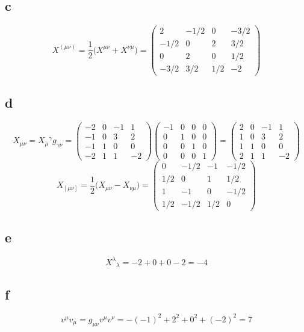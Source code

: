 \documentclass{article}
\begin{document}
\subsection*{c}
\[
	X^{(\mu\nu)} = \frac{1}{2}\Big( X^{\mu\nu} + X^{\nu\mu} \Big)
	= \begin{pmatrix}
		2 & -1/2 & 0 & -3/2 \\
		-1/2 & 0 & 2 & 3/2 \\
		0 & 2 & 0 & 1/2 \\
		-3/2 & 3/2 & 1/2 & -2
	\end{pmatrix}
\]
\subsection*{d}
\[
	X_{\mu\nu} = X_{\mu}{}^{\gamma}g_{\gamma\nu}
	= \begin{pmatrix}
		-2 & 0 & -1 & 1 \\
		-1 & 0 & 3 & 2 \\
		-1 & 1 & 0 & 0 \\
		-2 & 1 & 1 & -2
	\end{pmatrix}
	\begin{pmatrix}
		-1 & 0 & 0 & 0 \\
		0 & 1 & 0 & 0 \\
		0 & 0 & 1 & 0 \\
		0 & 0 & 0 & 1
	\end{pmatrix}
	=  \begin{pmatrix}
		2 & 0 & -1 & 1 \\
		1 & 0 & 3 & 2 \\
		1 & 1 & 0 & 0 \\
		2 & 1 & 1 & -2
	\end{pmatrix}
\]
\[
	X_{[\mu\nu]} = \frac{1}{2} \Big( X_{\mu\nu} - X_{\nu\mu} \Big)
 	= \begin{pmatrix}
		0 & -1/2 & -1 & -1/2 \\
		1/2 & 0 & 1 & 1/2 \\
		1 & -1 & 0 & -1/2 \\
		1/2 & -1/2 & 1/2 & 0
	\end{pmatrix}
\]
\subsection*{e}
\[ X^\lambda{}_\lambda = -2 + 0 + 0  -2 = -4 \]
\subsection*{f}
\[ v^\mu v_\mu = g_{\mu\nu} v^\mu v^\nu = -(-1)^2 + 2^2 + 0^2 + (-2)^2 = 7  \]
\end{document}
